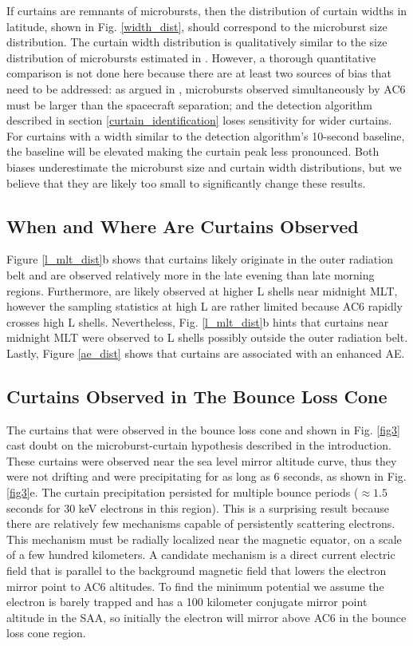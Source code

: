 \documentclass[draft]{agujournal2019}
\begin{document}
If curtains are remnants of microbursts, then the distribution of curtain widths in latitude, shown in Fig. \ref{width_dist}, should correspond to the microburst size distribution. The curtain width distribution is qualitatively similar to the size distribution of microbursts estimated in . However, a thorough quantitative comparison is not done here because there are at least two sources of bias that need to be addressed: as argued in , microbursts observed simultaneously by AC6 must be larger than the spacecraft separation; and the detection algorithm described in section \ref{curtain_identification} loses sensitivity for wider curtains. For curtains with a width similar to the detection algorithm's 10-second baseline, the baseline will be elevated making the curtain peak less pronounced. Both biases underestimate the microburst size and curtain width distributions, but we believe that they are likely too small to significantly change these results.

\subsection{When and Where Are Curtains Observed}
Figure \ref{l_mlt_dist}b shows that curtains likely originate in the outer radiation belt and are observed relatively more in the late evening than late morning regions. Furthermore, are likely observed at higher L shells near midnight MLT, however the sampling statistics at high L are rather limited because AC6 rapidly crosses high L shells. Nevertheless, Fig. \ref{l_mlt_dist}b hints that curtains near midnight MLT were observed to L shells possibly outside the outer radiation belt. Lastly, Figure \ref{ae_dist} shows that curtains are associated with an enhanced AE.
 
\subsection{Curtains Observed in The Bounce Loss Cone}
The curtains that were observed in the bounce loss cone and shown in Fig. \ref{fig3} cast doubt on the microburst-curtain hypothesis described in the introduction. These curtains were observed near the sea level mirror altitude curve, thus they were not drifting and were precipitating for as long as 6 seconds, as shown in Fig. \ref{fig3}e. The curtain precipitation persisted for multiple bounce periods ($\approx 1.5$ seconds for 30 keV electrons in this region). This is a surprising result because there are relatively few mechanisms capable of persistently scattering electrons. This mechanism must be radially localized near the magnetic equator, on a scale of a few hundred kilometers. A candidate mechanism is a direct current electric field that is parallel to the background magnetic field that lowers the electron mirror point to AC6 altitudes. To find the minimum potential we assume the electron is barely trapped and has a 100 kilometer conjugate mirror point altitude in the SAA, so initially the electron will mirror above AC6 in the bounce loss cone region. 
\end{document}
